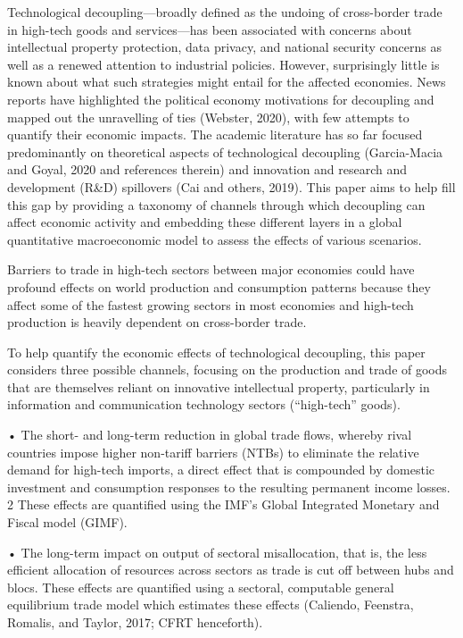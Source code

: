 \documentclass[
]{book}
\begin{document}
Technological decoupling---broadly defined as the undoing of cross-border trade in high-tech
goods and services---has been associated with concerns about intellectual property protection,
data privacy, and national security concerns as well as a renewed attention to industrial policies.
However, surprisingly little is known about what such strategies might entail for the affected
economies. News reports have highlighted the political economy motivations for decoupling and
mapped out the unravelling of ties (Webster, 2020), with few attempts to quantify their economic
impacts. The academic literature has so far focused predominantly on theoretical aspects of
technological decoupling (Garcia-Macia and Goyal, 2020 and references therein) and innovation
and research and development (R\&D) spillovers (Cai and others, 2019). This paper aims to help
fill this gap by providing a taxonomy of channels through which decoupling can affect economic
activity and embedding these different layers in a global quantitative macroeconomic model to
assess the effects of various scenarios.

Barriers to trade in high-tech sectors
between major economies could have
profound effects on world production
and consumption patterns because they
affect some of the fastest growing
sectors in most economies and high-tech
production is heavily dependent on
cross-border trade.

To help quantify the economic effects of technological decoupling, this paper considers three
possible channels, focusing on the production and trade of goods that are themselves reliant on
innovative intellectual property, particularly in information and communication technology
sectors (``high-tech'' goods).

• The short- and long-term reduction in global trade flows, whereby rival countries impose
higher non-tariff barriers (NTBs) to eliminate the relative demand for high-tech imports,
a direct effect that is compounded by domestic investment and consumption responses to
the resulting permanent income losses. 2 These effects are quantified using the IMF's
Global Integrated Monetary and Fiscal model (GIMF).

• The long-term impact on output of sectoral misallocation, that is, the less efficient
allocation of resources across sectors as trade is cut off between hubs and blocs. These
effects are quantified using a sectoral, computable general equilibrium trade model which
estimates these effects (Caliendo, Feenstra, Romalis, and Taylor, 2017; CFRT
henceforth).
\end{document}
